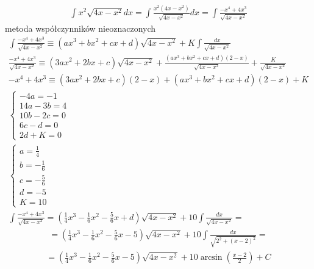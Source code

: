 \begin{gather*}\int x^2\sqrt{4x-x^2}dx = \int \frac{x^2(4x-x^2)}{\sqrt{4x-x^2}}dx = \int \frac{-x^4+4x^3}{\sqrt{4x-x^2}}\end{gather*}
metoda współczynników nieoznaczonych
\begin{gather*}\int \frac{-x^4+4x^3}{\sqrt{4x-x^2}} \equiv (ax^3+bx^2+cx+d)\sqrt{4x-x^2} + K\int \frac{dx}{\sqrt{4x-x^2}} \\
\frac{-x^4+4x^3}{\sqrt{4x-x^2}} \equiv (3ax^2+2bx+c)\sqrt{4x-x^2} + \frac{(ax^3+bx^2+cx+d)(2-x)}{\sqrt{4x-x^2}} + \frac{K}{\sqrt{4x-x^2}} \\
-x^4+4x^3 \equiv (3ax^2+2bx+c)(2-x) + (ax^3+bx^2+cx+d)(2-x) + K \\
\begin{cases} -4a=-1 \\ 14a-3b=4 \\ 10b-2c=0 \\ 6c-d=0 \\ 2d+K=0 \end{cases} \\
\begin{cases} a=\frac{1}{4} \\ b=-\frac{1}{6} \\ c=-\frac{5}{6} \\ d=-5 \\ K=10 \end{cases} \\
\int \frac{-x^4+4x^3}{\sqrt{4x-x^2}} = (\frac{1}{4}x^3-\frac{1}{6}x^2-\frac{5}{6}x+d)\sqrt{4x-x^2} + 10\int \frac{dx}{\sqrt{4x-x^2}} = \end{gather*}
\begin{gather*}= (\frac{1}{4}x^3-\frac{1}{6}x^2-\frac{5}{6}x-5)\sqrt{4x-x^2} + 10\int \frac{dx}{\sqrt{2^2+(x-2)^2}} = \end{gather*}
\begin{gather*}= (\frac{1}{4}x^3-\frac{1}{6}x^2-\frac{5}{6}x-5)\sqrt{4x-x^2} + 10\arcsin \left(\frac{x-2}{2}\right)+C
\end{gather*}



